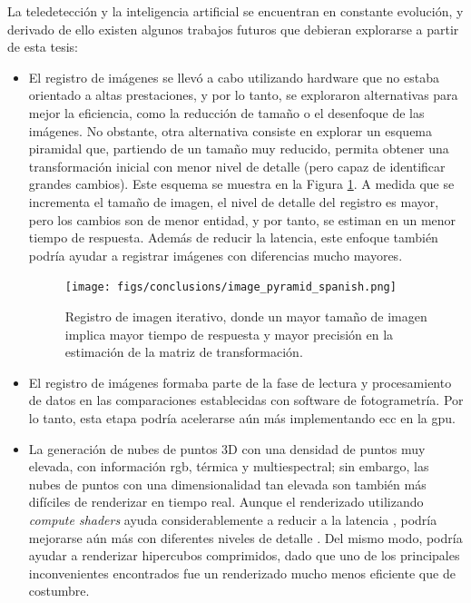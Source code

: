 La teledetección y la inteligencia artificial se encuentran en constante evolución, y derivado de ello existen algunos trabajos futuros que debieran explorarse a partir de esta tesis:
\begin{itemize}
    \item El registro de imágenes se llevó a cabo utilizando hardware que no estaba orientado a altas prestaciones, y por lo tanto, se exploraron alternativas para mejor la eficiencia, como la reducción de tamaño o el desenfoque de las imágenes. No obstante, otra alternativa consiste en explorar un esquema piramidal que, partiendo de un tamaño muy reducido, permita obtener una transformación inicial con menor nivel de detalle (pero capaz de identificar grandes cambios). Este esquema se muestra en la Figura \ref{fig:image_pyramid_spanish}. A medida que se incrementa el tamaño de imagen, el nivel de detalle del registro es mayor, pero los cambios son de menor entidad, y por tanto, se estiman en un menor tiempo de respuesta. Además de reducir la latencia, este enfoque también podría ayudar a registrar imágenes con diferencias mucho mayores.
    \begin{figure}
        \centering
        \texttt{[image: figs/conclusions/image\_pyramid\_spanish.png]}
        \caption{Registro de imagen iterativo, donde un mayor tamaño de imagen implica mayor tiempo de respuesta y mayor precisión en la estimación de la matriz de transformación.}
        \label{fig:image_pyramid_spanish}
    \end{figure}
    \item El registro de imágenes formaba parte de la fase de lectura y procesamiento de datos en las comparaciones establecidas con software de fotogrametría. Por lo tanto, esta etapa podría acelerarse aún más implementando \acrshort{ecc} en la \acrshort{gpu}.
    \item La generación de nubes de puntos 3D con una densidad de puntos muy elevada, con información \acrshort{rgb}, térmica y multiespectral; sin embargo, las nubes de puntos con una dimensionalidad tan elevada son también más difíciles de renderizar en tiempo real. Aunque el renderizado utilizando \textit{compute shaders} ayuda considerablemente a reducir a la latencia \cite{schutz_rendering_2021}, podría mejorarse aún más con diferentes niveles de detalle \cite{schutz_gpu-accelerated_2023}. Del mismo modo, podría ayudar a renderizar hipercubos comprimidos, dado que uno de los principales inconvenientes encontrados fue un renderizado mucho menos eficiente que de costumbre.

\end{itemize}

